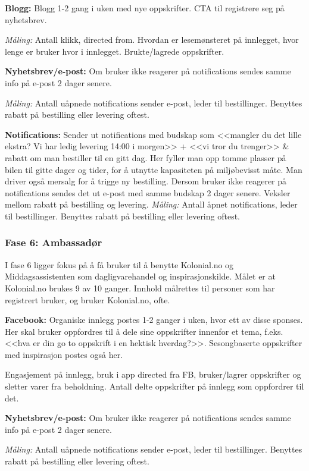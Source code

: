 \textbf{Blogg:} Blogg 1-2 gang i uken med nye oppskrifter. CTA til registrere seg på nyhetsbrev. 

\textit{Måling:} Antall klikk, directed from. Hvordan er lesemønsteret på innlegget, hvor lenge er bruker hvor i innlegget. Brukte/lagrede oppskrifter. 

\textbf{Nyhetsbrev/e-post:} Om bruker ikke reagerer på notifications sendes samme info på e-post 2 dager senere. 

\textit{Måling:} Antall uåpnede notifications sender e-post, leder til bestillinger. Benyttes rabatt på bestilling eller levering oftest. 

\textbf{Notifications:} Sender ut notifications med budskap som <<mangler du det lille ekstra? Vi har ledig levering 14:00 i morgen>> + <<vi tror du trenger>> & rabatt om man bestiller til en gitt dag. Her fyller man opp tomme plasser på bilen til gitte dager og tider, for å utnytte kapasiteten på miljøbevisst måte. Man driver også mersalg for å trigge ny bestilling. Dersom bruker ikke reagerer på notifications sendes det ut e-post med samme budskap 2 dager senere. Veksler mellom rabatt på bestilling og levering. 
\textit{Måling:} Antall åpnet notifications, leder til bestillinger. Benyttes rabatt på bestilling eller levering oftest. 

\subsubsection{\textbf{Fase 6: Ambassadør}}
I fase 6 ligger fokus på å få bruker til å benytte Kolonial.no og Middagsassistenten som dagligvarehandel og inspirasjonskilde. Målet er at Kolonial.no brukes 9 av 10 ganger. Innhold målrettes til personer som har registrert bruker, og bruker Kolonial.no, ofte. 

\textbf{Facebook:} Organiske innlegg postes 1-2 ganger i uken, hvor ett av disse sponses. Her skal bruker oppfordres til å dele sine oppskrifter innenfor et tema, f.eks. <<hva er din go to oppskrift i en hektisk hverdag?>>. Sesongbaserte oppskrifter med inspirasjon postes også her.  

 Engasjement på innlegg, bruk i app directed fra FB, bruker/lagrer oppskrifter og sletter varer fra beholdning. Antall delte oppskrifter på innlegg som oppfordrer til det. 

\textbf{Nyhetsbrev/e-post:} Om bruker ikke reagerer på notifications sendes samme info på e-post 2 dager senere. 

\textit{Måling:} Antall uåpnede notifications sender e-post, leder til bestillinger. Benyttes rabatt på bestilling eller levering oftest. 

